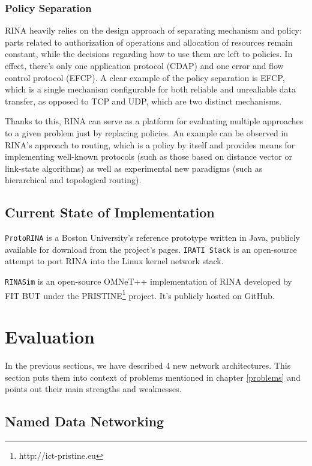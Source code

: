             \subsubsection{Policy Separation}

                RINA heavily relies on the design approach of separating mechanism and policy: parts related to authorization of operations and allocation of resources remain constant, while the decisions regarding how to use them are left to policies. In effect, there's only one application protocol (CDAP) and one error and flow control protocol (EFCP). A clear example of the policy separation is EFCP, which is a single mechanism configurable for both reliable and unrealiable data transfer, as opposed to TCP and UDP, which are two distinct mechanisms.

                Thanks to this, RINA can serve as a platform for evaluating multiple approaches to a given problem just by replacing policies. An example can be observed in RINA's approach to routing, which is a policy by itself and provides means for implementing well-known protocols (such as those based on distance vector or link-state algorithms) as well as experimental new paradigms (such as hierarchical and topological routing).

        \subsection{Current State of Implementation}

            \texttt{ProtoRINA} is a Boston University's reference prototype written in Java, publicly available for download from the project's pages. \texttt{IRATI Stack} is an open-source attempt to port RINA into the Linux kernel network stack.

            \texttt{RINASim} is an open-source OMNeT++ implementation of RINA developed by FIT BUT under the PRISTINE\footnote{http://ict-pristine.eu} project. It's publicly hosted on GitHub.

    \section{Evaluation}

        In the previous sections, we have described 4 new network architectures. This section puts them into context of problems mentioned in chapter \ref{problems} and points out their main strengths and weaknesses.

        \subsection{Named Data Networking}

